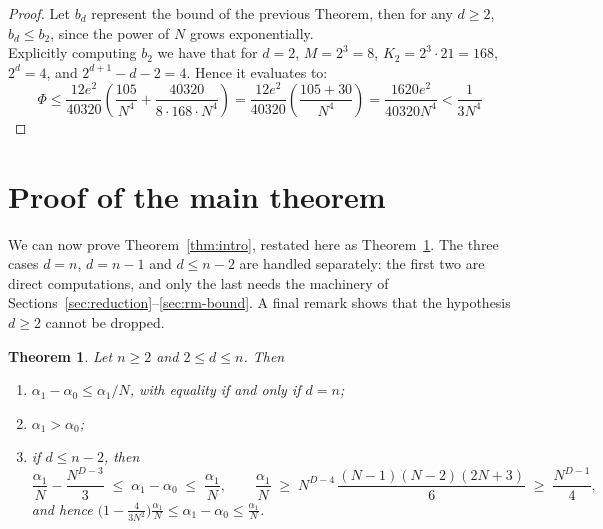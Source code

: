 \documentclass[11pt,a4paper]{article}
\newtheorem{theorem}{Theorem}[section]
\theoremstyle{definition}
\begin{document}
\begin{proof}
 Let $b_d$ represent the bound of the previous Theorem, then for any $d \ge 2$, $b_d \le b_2$, since the power of $N$ grows exponentially. \\
 Explicitly computing $b_2$ we have that for $d = 2$, $M = 2^3 = 8$, $K_2 = 2^3 \cdot 21 = 168$, $2^d = 4$, and $2^{d+1} - d - 2 = 4$. Hence it evaluates to:
\[
\Phi \le \frac{12e^2}{40320} \left( \frac{105}{N^4} + \frac{40320}{8 \cdot 168 \cdot N^4} \right) = \frac{12e^2}{40320} \left( \frac{105 + 30}{N^4} \right) = \frac{1620 e^2}{40320 N^4} < \frac{1}{3 N^4}
\]
\end{proof}

\section{Proof of the main theorem}\label{sec:mainthm}

We can now prove Theorem~\ref{thm:intro}, restated here as
Theorem~\ref{thm:main}. The three cases $d=n$, $d=n-1$ and $d\le n-2$ are handled
separately: the first two are direct computations, and only the last needs the
machinery of Sections~\ref{sec:reduction}--\ref{sec:rm-bound}. A final remark shows
that the hypothesis $d\ge2$ cannot be dropped.

\begin{theorem}\label{thm:main}
Let $n\ge2$ and $2\le d\le n$. Then
\begin{enumerate}[label=\textnormal{(\roman*)}]
\item $\alpha_1-\alpha_0\le\alpha_1/N$, with equality if and only if $d=n$;
\item $\alpha_1>\alpha_0$;
\item if $d\le n-2$, then
\[
\frac{\alpha_1}{N}-\frac{N^{D-3}}{3}\;\le\;\alpha_1-\alpha_0\;\le\;\frac{\alpha_1}{N},
\qquad
\frac{\alpha_1}{N}\;\ge\;N^{D-4}\,\frac{(N-1)(N-2)(2N+3)}{6}\;\ge\;\frac{N^{D-1}}4,
\]
and hence $\bigl(1-\frac4{3N^2}\bigr)\frac{\alpha_1}N\le\alpha_1-\alpha_0\le\frac{\alpha_1}N$.
\end{enumerate}
\end{theorem}
\end{document}
